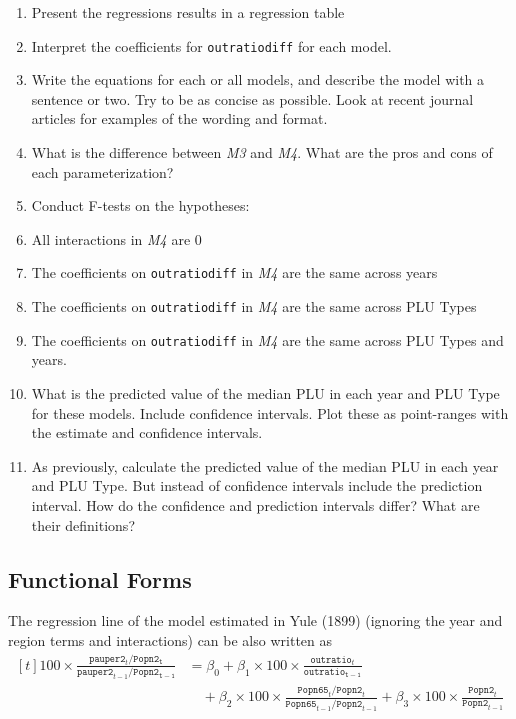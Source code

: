 \documentclass[]{article}
\begin{document}
\begin{enumerate}
\def\labelenumi{\arabic{enumi}.}
\item
  Present the regressions results in a regression table
\item
  Interpret the coefficients for \texttt{outratiodiff} for each model.
\item
  Write the equations for each or all models, and describe the model
  with a sentence or two. Try to be as concise as possible. Look at
  recent journal articles for examples of the wording and format.
\item
  What is the difference between \emph{M3} and \emph{M4}. What are the
  pros and cons of each parameterization?
\item
  Conduct F-tests on the hypotheses:
\item
  All interactions in \emph{M4} are 0
\item
  The coefficients on \texttt{outratiodiff} in \emph{M4} are the same
  across years
\item
  The coefficients on \texttt{outratiodiff} in \emph{M4} are the same
  across PLU Types
\item
  The coefficients on \texttt{outratiodiff} in \emph{M4} are the same
  across PLU Types and years.
\item
  What is the predicted value of the median PLU in each year and PLU
  Type for these models. Include confidence intervals. Plot these as
  point-ranges with the estimate and confidence intervals.
\item
  As previously, calculate the predicted value of the median PLU in each
  year and PLU Type. But instead of confidence intervals include the
  prediction interval. How do the confidence and prediction intervals
  differ? What are their definitions?
\end{enumerate}

\subsection{Functional Forms}\label{functional-forms}

The regression line of the model estimated in Yule (1899) (ignoring the
year and region terms and interactions) can be also written as \[
\begin{aligned}[t]
100 \times \frac{\mathtt{pauper2}_t / \mathtt{Popn2_t}}{\mathtt{pauper2}_{t-1} / \mathtt{Popn2_{t-1}}} 
&= \beta_0 + \beta_1 \times 100 \times \frac{\mathtt{outratio}_t}{\mathtt{outratio_{t-1}}} \\
& \quad + \beta_2 \times 100 \times \frac{\mathtt{Popn65}_t / \mathtt{Popn2}_{t}}{\mathtt{Popn65}_{t-1} / \mathtt{Popn2}_{t-1}} + \beta_3 \times 100 \times \frac{\mathtt{Popn2}_t}{\mathtt{Popn2}_{t - 1}}
\end{aligned}
\]
\end{document}
